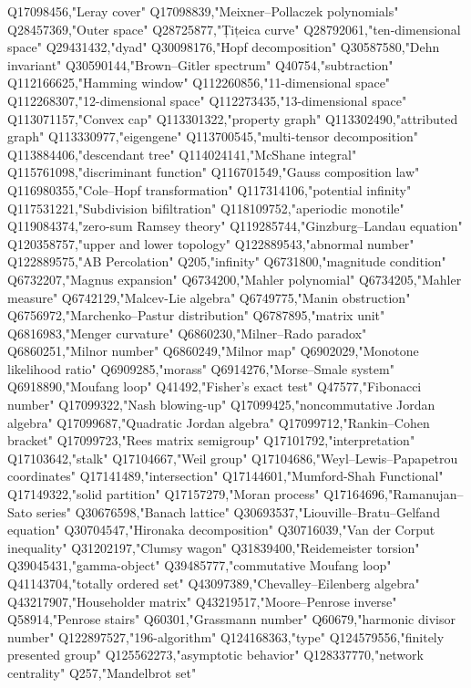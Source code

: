Q17098456,"Leray cover"
Q17098839,"Meixner–Pollaczek polynomials"
Q28457369,"Outer space"
Q28725877,"Țițeica curve"
Q28792061,"ten-dimensional space"
Q29431432,"dyad"
Q30098176,"Hopf decomposition"
Q30587580,"Dehn invariant"
Q30590144,"Brown–Gitler spectrum"
Q40754,"subtraction"
Q112166625,"Hamming window"
Q112260856,"11-dimensional space"
Q112268307,"12-dimensional space"
Q112273435,"13-dimensional space"
Q113071157,"Convex cap"
Q113301322,"property graph"
Q113302490,"attributed graph"
Q113330977,"eigengene"
Q113700545,"multi-tensor decomposition"
Q113884406,"descendant tree"
Q114024141,"McShane integral"
Q115761098,"discriminant function"
Q116701549,"Gauss composition law"
Q116980355,"Cole–Hopf transformation"
Q117314106,"potential infinity"
Q117531221,"Subdivision bifiltration"
Q118109752,"aperiodic monotile"
Q119084374,"zero-sum Ramsey theory"
Q119285744,"Ginzburg–Landau equation"
Q120358757,"upper and lower topology"
Q122889543,"abnormal number"
Q122889575,"AB Percolation"
Q205,"infinity"
Q6731800,"magnitude condition"
Q6732207,"Magnus expansion"
Q6734200,"Mahler polynomial"
Q6734205,"Mahler measure"
Q6742129,"Malcev-Lie algebra"
Q6749775,"Manin obstruction"
Q6756972,"Marchenko–Pastur distribution"
Q6787895,"matrix unit"
Q6816983,"Menger curvature"
Q6860230,"Milner–Rado paradox"
Q6860251,"Milnor number"
Q6860249,"Milnor map"
Q6902029,"Monotone likelihood ratio"
Q6909285,"morass"
Q6914276,"Morse–Smale system"
Q6918890,"Moufang loop"
Q41492,"Fisher's exact test"
Q47577,"Fibonacci number"
Q17099322,"Nash blowing-up"
Q17099425,"noncommutative Jordan algebra"
Q17099687,"Quadratic Jordan algebra"
Q17099712,"Rankin–Cohen bracket"
Q17099723,"Rees matrix semigroup"
Q17101792,"interpretation"
Q17103642,"stalk"
Q17104667,"Weil group"
Q17104686,"Weyl–Lewis–Papapetrou coordinates"
Q17141489,"intersection"
Q17144601,"Mumford-Shah Functional"
Q17149322,"solid partition"
Q17157279,"Moran process"
Q17164696,"Ramanujan–Sato series"
Q30676598,"Banach lattice"
Q30693537,"Liouville–Bratu–Gelfand equation"
Q30704547,"Hironaka decomposition"
Q30716039,"Van der Corput inequality"
Q31202197,"Clumsy wagon"
Q31839400,"Reidemeister torsion"
Q39045431,"gamma-object"
Q39485777,"commutative Moufang loop"
Q41143704,"totally ordered set"
Q43097389,"Chevalley–Eilenberg algebra"
Q43217907,"Householder matrix"
Q43219517,"Moore–Penrose inverse"
Q58914,"Penrose stairs"
Q60301,"Grassmann number"
Q60679,"harmonic divisor number"
Q122897527,"196-algorithm"
Q124168363,"type"
Q124579556,"finitely presented group"
Q125562273,"asymptotic behavior"
Q128337770,"network centrality"
Q257,"Mandelbrot set"
